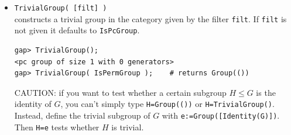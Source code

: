 \documentclass[11pt]{amsart}
\theoremstyle{plain}
\newcommand{\codesize}{\footnotesize}
\newcommand{\<}{\ensuremath{\langle}}
\renewcommand{\>}{\ensuremath{\rangle}}
\renewcommand{\leq}{\ensuremath{\leqslant}}
\begin{document}
\begin{itemize}
\item {\tt TrivialGroup( [filt] )}\\[2pt] 
constructs a trivial group in the category given by the filter {\tt filt}. If {\tt filt} is not given it defaults to
{\tt IsPcGroup}. %
{\codesize
\begin{verbatim}
gap> TrivialGroup();
<pc group of size 1 with 0 generators>
gap> TrivialGroup( IsPermGroup );    # returns Group(())
\end{verbatim}}
\noindent CAUTION: if you want to test whether a certain subgroup $H \leq G$ is the
identity of $G$, you can't simply type {\tt H=Group(())} or {\tt H=TrivialGroup()}.  
Instead, define the trivial subgroup of $G$ with {\tt e:=Group([Identity(G)])}.  Then
{\tt H=e} tests whether $H$ is trivial.


\end{itemize}
\end{document}
